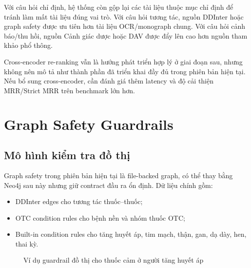 Với câu hỏi chỉ định, hệ thống còn gộp lại các tài liệu thuộc mục chỉ định để tránh làm mất tài liệu đúng vai trò. Với câu hỏi tương tác, nguồn DDInter hoặc graph safety được ưu tiên hơn tài liệu OCR/monograph chung. Với câu hỏi cảnh báo/thu hồi, nguồn Cảnh giác dược hoặc DAV được đẩy lên cao hơn nguồn tham khảo phổ thông.

Cross-encoder re-ranking vẫn là hướng phát triển hợp lý ở giai đoạn sau, nhưng không nên mô tả như thành phần đã triển khai đầy đủ trong phiên bản hiện tại. Nếu bổ sung cross-encoder, cần đánh giá thêm latency và độ cải thiện MRR/Strict MRR trên benchmark lớn hơn.

\section{Graph Safety Guardrails}

\subsection{Mô hình kiểm tra đồ thị}

Graph safety trong phiên bản hiện tại là file-backed graph, có thể thay bằng Neo4j sau này nhưng giữ contract đầu ra ổn định. Dữ liệu chính gồm:

\begin{itemize}
  \item DDInter edges cho tương tác thuốc--thuốc;
  \item OTC condition rules cho bệnh nền và nhóm thuốc OTC;
  \item Built-in condition rules cho tăng huyết áp, tim mạch, thận, gan, dạ dày, hen, thai kỳ.
\end{itemize}

\begin{figure}[H]
\centering
{}
\caption{Ví dụ guardrail đồ thị cho thuốc cảm ở người tăng huyết áp}
\end{figure}


